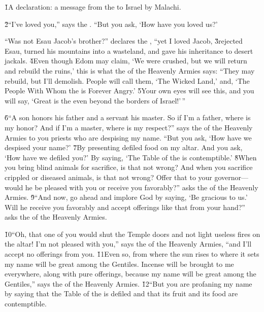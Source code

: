 


\v{1}A declaration: a message from the  to Israel by Malachi.

\v{2}``I've loved you,'' says the . ``But you ask, `How have you loved us?'

``Was not Esau Jacob's brother?'' declares the , ``yet I loved Jacob, \v{3}rejected Esau, turned his mountains into a wasteland, and gave his inheritance to desert jackals. \v{4}Even though Edom may claim, `We were crushed, but we will return and rebuild the ruins,' this is what the  of the Heavenly Armies says: ``They may rebuild, but I'll demolish. People will call them, `The Wicked Land,' and, `The People With Whom the  is Forever Angry.' \v{5}Your own eyes will see this, and you will say, `Great is the  even beyond the borders of Israel!'\,''

\v{6}``A son honors his father and a servant his master. So if I'm a father, where is my honor? And if I'm a master, where is my respect?'' says the  of the Heavenly Armies to you priests who are despising my name. ``But you ask, `How have we despised your name?' \v{7}By presenting defiled food on my altar. And you ask, `How have we defiled you?' By saying, `The Table of the  is contemptible.' \v{8}When you bring blind animals for sacrifice, is that not wrong? And when you sacrifice crippled or diseased animals, is that not wrong? Offer that to your governor---would he be pleased with you or receive you favorably?'' asks the  of the Heavenly Armies. \v{9}``And now, go ahead and implore God by saying, `Be gracious to us.' Will he receive you favorably and accept offerings like that from your hand?'' asks the  of the Heavenly Armies.

\v{10}``Oh, that one of you would shut the Temple doors and not light useless fires on the altar! I'm not pleased with you,'' says the  of the Heavenly Armies, ``and I'll accept no offerings from you. \v{11}Even so, from where the sun rises to where it sets my name will be great among the Gentiles. Incense will be brought to me everywhere, along with pure offerings, because my name will be great among the Gentiles,'' says the  of the Heavenly Armies. \v{12}``But you are profaning my name by saying that the Table of the  is defiled and that its fruit and its food are contemptible.

